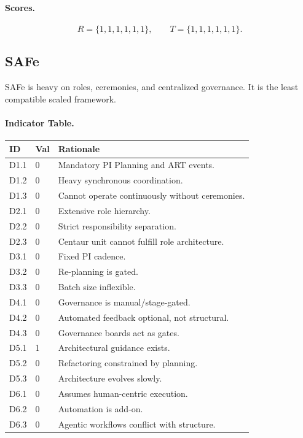 \documentclass[11pt, a4paper, twocolumn]{article} %
\begin{document}
\paragraph{Scores.}

\[
R = \{1,1,1,1,1,1\},\qquad
T = \{1,1,1,1,1,1\}.
\]

\newpage
\subsection*{SAFe}

SAFe \citep{scaledagile45reference,scaledagile5reference,scaledagile6update} is heavy on roles, ceremonies, and centralized
governance. It is the least compatible scaled framework.

\paragraph{Indicator Table.}

\begin{table}[h]
\centering
\begin{tabular}{llp{10.5cm}}
\toprule
\textbf{ID} & \textbf{Val} & \textbf{Rationale} \\
\midrule
D1.1 & 0 & Mandatory PI Planning and ART events. \\
D1.2 & 0 & Heavy synchronous coordination. \\
D1.3 & 0 & Cannot operate continuously without ceremonies. \\
\midrule
D2.1 & 0 & Extensive role hierarchy. \\
D2.2 & 0 & Strict responsibility separation. \\
D2.3 & 0 & Centaur unit cannot fulfill role architecture. \\
\midrule
D3.1 & 0 & Fixed PI cadence. \\
D3.2 & 0 & Re-planning is gated. \\
D3.3 & 0 & Batch size inflexible. \\
\midrule
D4.1 & 0 & Governance is manual/stage-gated. \\
D4.2 & 0 & Automated feedback optional, not structural. \\
D4.3 & 0 & Governance boards act as gates. \\
\midrule
D5.1 & 1 & Architectural guidance exists. \\
D5.2 & 0 & Refactoring constrained by planning. \\
D5.3 & 0 & Architecture evolves slowly. \\
\midrule
D6.1 & 0 & Assumes human-centric execution. \\
D6.2 & 0 & Automation is add-on. \\
D6.3 & 0 & Agentic workflows conflict with structure. \\
\bottomrule
\end{tabular}
\end{table}
\end{document}
